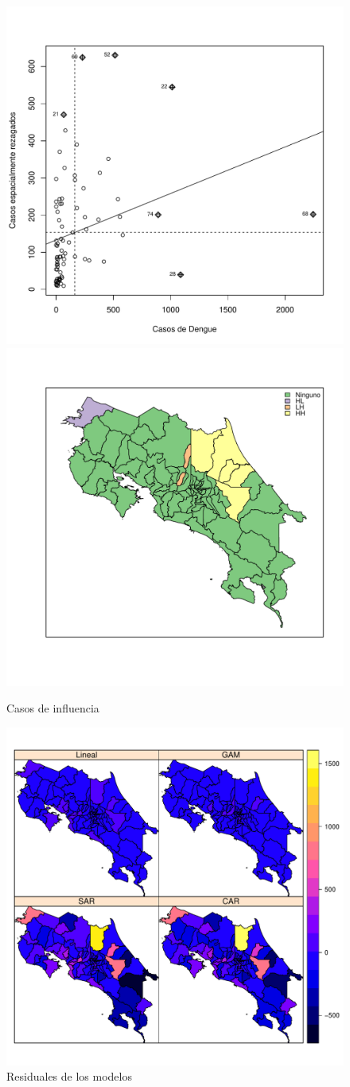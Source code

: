 \documentclass[12pt,a4paper]{article}
\begin{document}
\begin{figure}[hbtp]
\centering
\includegraphics[width=.48\textwidth]{F31.pdf}
\includegraphics[width=.48\textwidth]{F32.pdf}
\caption{Casos de influencia}
\end{figure}

\begin{figure}[hbtp]
\centering
\includegraphics[scale=0.75]{F4.pdf}
\caption{Residuales de los modelos}
\end{figure}
\end{document}
